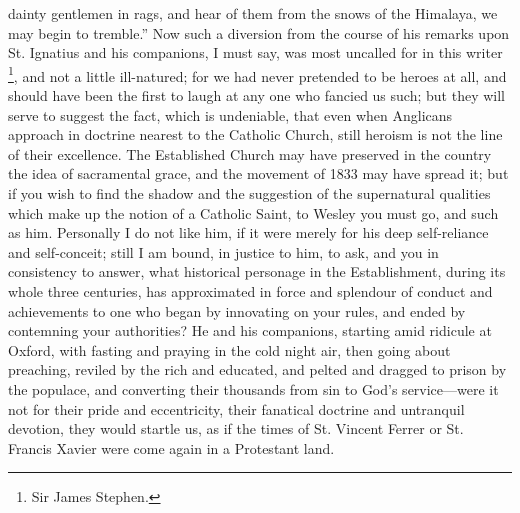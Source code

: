 dainty gentlemen in rags, and hear of them from the snows of the
Himalaya, we may begin to tremble.'' Now such a diversion from the
course of his remarks upon St. Ignatius and his companions, I must
say, was most uncalled for in this writer \footnote{Sir James Stephen.}, and not a little ill-natured; for we had never pretended to
be heroes at all, and should have been the first to laugh at any one
who fancied us such; but they will serve to suggest the fact, which is
undeniable, that even when Anglicans approach in doctrine nearest to
the Catholic Church, still heroism is not the line of their
excellence. The Established Church may have preserved in the country
the idea of sacramental grace, and the movement of 1833 may have
spread it; but if you wish to find the shadow and the suggestion of
the supernatural qualities which make up the notion of a Catholic
Saint, to Wesley you must go, and such as him. Personally I do not
like him, if it were merely for his deep self-reliance and
self-conceit; still I am bound, in justice to him, to ask, and you in
consistency to answer, what historical personage in the Establishment,
during its whole three centuries, has approximated in force and
splendour of conduct and achievements to one who began by innovating
on your rules, and ended by contemning your authorities? He and his
companions, starting amid ridicule at Oxford, with fasting and praying
in the cold night air, then going about preaching, reviled by the rich
and educated, and pelted and dragged to prison by the populace, and
converting their thousands from sin to God's service—were it not for
their pride and eccentricity, their fanatical doctrine and untranquil
devotion, they would startle us, as if the times of St. Vincent Ferrer
or St. Francis Xavier were come again in a Protestant land.

